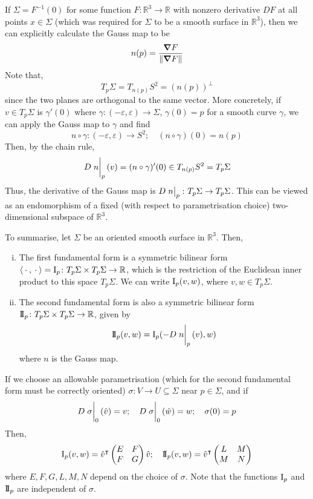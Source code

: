 \begin{remark}
	If \( \Sigma = F^{-1}(0) \) for some function \( F \colon \mathbb R^3 \to \mathbb R \) with nonzero derivative \( DF \) at all points \( x \in \Sigma \) (which was required for \( \Sigma \) to be a smooth surface in \( \mathbb R^3 \)), then we can explicitly calculate the Gauss map to be
	\[ n(p) = \frac{\grad F}{\norm{\grad F}} \]
	Note that,
	\[ T_p \Sigma = T_{n(p)} S^2 = (n(p))^\perp \]
	since the two planes are orthogonal to the same vector.
	More concretely, if \( v \in T_p \Sigma \) is \( \gamma'(0) \) where \( \gamma \colon (-\varepsilon, \varepsilon) \to \Sigma \), \( \gamma(0) = p \) for a smooth curve \( \gamma \), we can apply the Gauss map to \( \gamma \) and find
	\[ n \circ \gamma \colon (-\varepsilon, \varepsilon) \to S^2;\quad (n \circ \gamma)(0) = n(p) \]
	Then, by the chain rule,
	\[ D\eval{n}_p(v) = (n \circ \gamma)'(0) \in T_{n(p)} S^2 = T_p \Sigma \]
	Thus, the derivative of the Gauss map is \( D\eval{n}_p \colon T_p \Sigma \to T_p \Sigma \).
	This can be viewed as an endomorphism of a fixed (with respect to parametrisation choice) two-dimensional subspace of \( \mathbb R^3 \).

	To summarise, let \( \Sigma \) be an oriented smooth surface in \( \mathbb R^3 \).
	Then,
	\begin{enumerate}[(i)]
		\item The first fundamental form is a symmetric bilinear form \( \left\langle{{}\cdot{},{}\cdot{}}\right\rangle = \operatorname{\mathrm{I}}_p \colon T_p \Sigma \times T_p \Sigma \to \mathbb R \), which is the restriction of the Euclidean inner product to this space \( T_p \Sigma \).
			We can write \( \operatorname{\mathrm{I}}_p(v,w) \), where \( v, w \in T_p \Sigma \).
		\item The second fundamental form is also a symmetric bilinear form \( \operatorname{\mathrm{I\!I}}_p \colon T_p \Sigma \times T_p \Sigma \to \mathbb R \), given by
			\[ \IIff_p(v,w) = \Iff_p(-D\eval{n}_p(v), w) \]
			where \( n \) is the Gauss map.
	\end{enumerate}
	If we choose an allowable parametrisation (which for the second fundamental form must be correctly oriented) \( \sigma \colon V \to U \subseteq \Sigma \) near \( p \in \Sigma \), and if
	\[ D \eval{\sigma}_0(\hat v) = v;\quad D \eval{\sigma}_0(\hat w) = w;\quad \sigma(0) = p \]
	Then,
	\[ \operatorname{\mathrm{I}}_p(v,w) = {\hat v}^\intercal \begin{pmatrix}
		E & F \\
		F & G
	\end{pmatrix} \hat v;\quad \operatorname{\mathrm{I\!I}}_p(v,w) = {\hat v}^\intercal \begin{pmatrix}
		L & M \\
		M & N
	\end{pmatrix} \]
	where \( E, F, G, L, M, N \) depend on the choice of \( \sigma \).
	Note that the functions \( \operatorname{\mathrm{I}}_p \) and \( \operatorname{\mathrm{I\!I}}_p \) are independent of \( \sigma \).
\end{remark}
